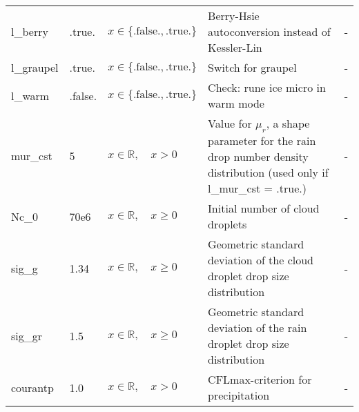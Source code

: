 \documentclass[twoside,11pt,fleqn,a4paper,english,openright]{report}
\begin{document}
\begin{center}
\begin{supertabular}{|l|p{1.6cm}|p{4cm}|p{6cm}|l|}
    l\_berry	& .true.		& $x\in\{\text{.false.},\text{.true.}\}$	& Berry-Hsie autoconversion instead of Kessler-Lin	& -\\
  l\_graupel	& .true.		& $x\in\{\text{.false.},\text{.true.}\}$	& Switch for graupel	& -\\
  l\_warm	& .false.		& $x\in\{\text{.false.},\text{.true.}\}$	& Check: rune ice micro in warm mode	& -\\
  mur\_cst	& 5			& $x \in \mathbb{R}, \quad x>0$	& Value for $\mu_r$, a shape parameter for the rain drop number density distribution (used only if l\_mur\_cst = .true.)	& -\\
  Nc\_0		& 70e6			& $x \in \mathbb{R}, \quad x \ge 0$	& Initial number of cloud droplets			& -\\
  sig\_g	& 1.34			& $x \in \mathbb{R}, \quad x \ge 0$	& Geometric standard deviation of the cloud droplet drop size distribution			& -\\
  sig\_gr	& 1.5		& $x \in \mathbb{R}, \quad x \ge 0$	& Geometric standard deviation of the rain droplet drop size distribution			& -\\
  courantp	& 1.0		& $x \in \mathbb{R}, \quad x>0$		& CFLmax-criterion for precipitation & -\\
\end{supertabular}
\end{center}

\end{document}
